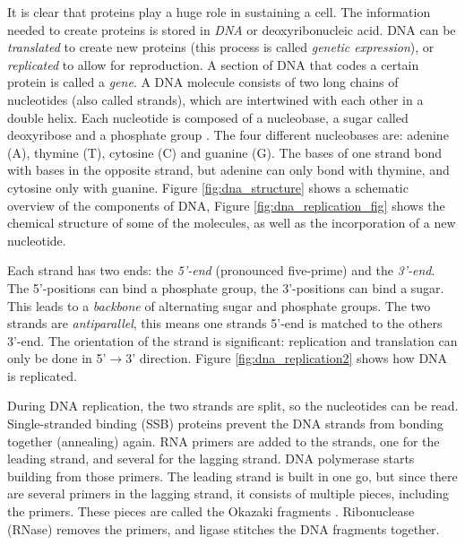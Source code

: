 \documentclass[../main/thesis.tex]{subfiles}
\begin{document}
It is clear that proteins play a huge role in sustaining a cell.
The information needed to create proteins is stored in \textit{DNA} or deoxyribonucleic acid.
DNA can be \textit{translated} to create new proteins (this process is called \textit{genetic expression}), or \textit{replicated} to allow for reproduction.
A section of DNA that codes a certain protein is called a \textit{gene}.
A DNA molecule consists of two long chains of nucleotides (also called strands), which are intertwined with each other in a double helix.
Each nucleotide is composed of a nucleobase, a sugar called deoxyribose and a phosphate group \cite{dna_structure}.
The four different nucleobases are: adenine (A), thymine (T), cytosine (C) and guanine (G).
The bases of one strand bond with bases in the opposite strand, but adenine can only bond with thymine, and cytosine only with guanine.
Figure \ref{fig:dna_structure} shows a schematic overview of the components of DNA, Figure \ref{fig:dna_replication_fig} shows the chemical structure of some of the molecules, as well as the incorporation of a new nucleotide.


Each strand has two ends: the \textit{5'-end} (pronounced five-prime) and the \textit{3'-end}.
The 5'-positions can bind a phosphate group, the 3'-positions can bind a sugar.
This leads to a \textit{backbone} of alternating sugar and phosphate groups.
The two strands are \textit{antiparallel}, this means one strands 5'-end is matched to the others 3'-end.
The orientation of the strand is significant: replication and translation can only be done in 5'$\rightarrow$3' direction.
Figure \ref{fig:dna_replication2} shows how DNA is replicated.


During DNA replication, the two strands are split, so the nucleotides can be read.
Single-stranded binding (SSB) proteins prevent the DNA strands from bonding together (annealing) again.
RNA primers are added to the strands, one for the leading strand, and several for the lagging strand.
DNA polymerase starts building from those primers.
The leading strand is built in one go, but since there are several primers in the lagging strand, it consists of multiple pieces, including the primers.
These pieces are called the Okazaki fragments \cite{Okazaki_fragments}.
Ribonuclease (RNase) removes the primers, and ligase stitches the DNA fragments together.
\end{document}
